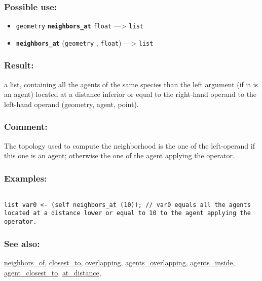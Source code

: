 \documentclass[]{book}
\providecommand{\tightlist}{%
  \setlength{\itemsep}{0pt}\setlength{\parskip}{0pt}}
\theoremstyle{definition}
\theoremstyle{definition}
\theoremstyle{definition}
\theoremstyle{remark}
\begin{document}
\subsubsection{Possible use:}\label{possible-use-366}

\begin{itemize}
\tightlist
\item
  \texttt{geometry} \textbf{\texttt{neighbors\_at}} \texttt{float}
  ---\textgreater{} \texttt{list}
\item
  \textbf{\texttt{neighbors\_at}} (\texttt{geometry} , \texttt{float})
  ---\textgreater{} \texttt{list}
\end{itemize}

\subsubsection{Result:}\label{result-354}

a list, containing all the agents of the same species than the left
argument (if it is an agent) located at a distance inferior or equal to
the right-hand operand to the left-hand operand (geometry, agent,
point).

\subsubsection{Comment:}\label{comment-73}

The topology used to compute the neighborhood is the one of the
left-operand if this one is an agent; otherwise the one of the agent
applying the operator.

\subsubsection{Examples:}\label{examples-253}

\begin{verbatim}
 
list var0 <- (self neighbors_at (10)); // var0 equals all the agents located at a distance lower or equal to 10 to the agent applying the operator.
\end{verbatim}

\subsubsection{See also:}\label{see-also-146}

\href{OperatorsNR\#neighbors_of}{neighbors\_of},
\href{OperatorsBC\#closest_to}{closest\_to},
\href{OperatorsNR\#overlapping}{overlapping},
\href{OperatorsAA\#agents_overlapping}{agents\_overlapping},
\href{OperatorsAA\#agents_inside}{agents\_inside},
\href{OperatorsAA\#agent_closest_to}{agent\_closest\_to},
\href{OperatorsAA\#at_distance}{at\_distance},
\end{document}
